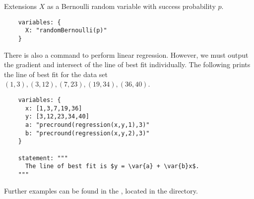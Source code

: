 \begin{chapter}{\label{cha:extensions}Extensions}
  $X$ as a Bernoulli random variable with success probability $p$.
  \begin{Verbatim}
    variables: {
      X: "randomBernoulli(p)"
    }
  \end{Verbatim}
  There is also a command to perform linear regression. However, we must output
  the gradient and intersect of the line of best fit individually.  The
  following prints the line of best fit for the data set $(1,3), (3,12),
  (7,23), (19,34), (36,40)$.
  \begin{Verbatim}
    variables: {
      x: [1,3,7,19,36]
      y: [3,12,23,34,40]
      a: "precround(regression(x,y,1),3)"
      b: "precround(regression(x,y,2),3)"
    }
    
    statement: """
      The line of best fit is $y = \var{a} + \var{b}x$.
    """  
	\end{Verbatim}
  Further examples can be found in the , located
  in the  directory.
		
\end{chapter}
